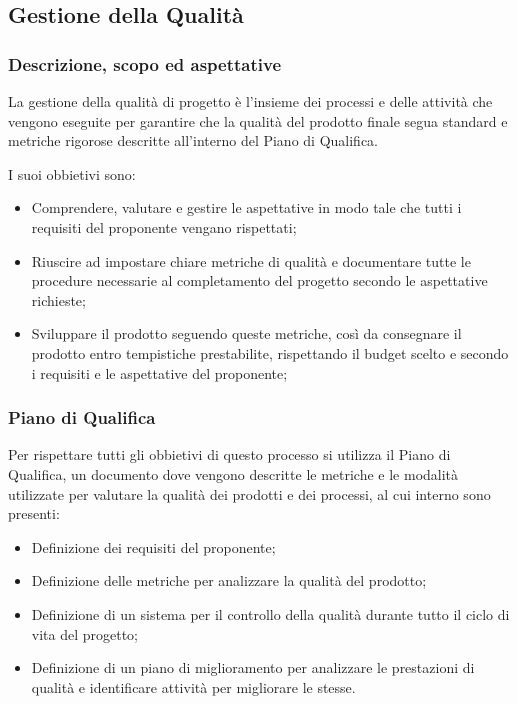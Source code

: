 \pagebreak %
\subsection{Gestione della Qualità}

\subsubsection{Descrizione, scopo ed aspettative}
La gestione della qualità di progetto è l'insieme dei processi e delle attività che vengono eseguite per garantire che la qualità del prodotto finale 
segua standard e metriche rigorose descritte all'interno del Piano di Qualifica.

I suoi obbietivi sono:
\begin{itemize}
    \item Comprendere, valutare e gestire le aspettative in modo tale che tutti i requisiti del proponente vengano rispettati;
    \item Riuscire ad impostare chiare metriche di qualità e documentare tutte le procedure necessarie al completamento del progetto secondo le aspettative richieste;
    \item Sviluppare il prodotto seguendo queste metriche, così da consegnare il prodotto entro tempistiche prestabilite, rispettando il budget scelto e secondo i requisiti e le aspettative del proponente;
\end{itemize}
\subsubsection{Piano di Qualifica}

Per rispettare tutti gli obbietivi di questo processo si utilizza il Piano di Qualifica, un documento dove vengono descritte le metriche e le modalità utilizzate per valutare la qualità dei prodotti e dei processi, 
al cui interno sono presenti:

\begin{itemize}
    \item Definizione dei requisiti del proponente; %
    \item Definizione delle metriche per analizzare la qualità del prodotto;
    \item Definizione di un sistema per il controllo della qualità durante tutto il ciclo di vita del progetto;
    \item Definizione di un piano di miglioramento per analizzare le prestazioni di qualità e identificare attività per migliorare le stesse.
\end{itemize}

